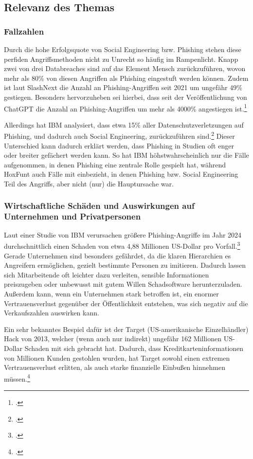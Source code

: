 \documentclass[12pt, a4paper, oneside]{scrartcl}
\begin{document}
\subsection{Relevanz des Themas}

\subsubsection{Fallzahlen}
Durch die hohe Erfolgsquote von Social Engineering bzw. Phishing stehen diese perfiden 
Angriffsmethoden nicht zu Unrecht so häufig im Rampenlicht. Knapp zwei von drei 
Databreaches sind auf das Element Mensch zurückzuführen, wovon mehr als 80\% von diesen Angriffen
als Phishing eingestuft werden können. Zudem ist laut SlashNext die Anzahl an Phishing-Angriffen
seit 2021 um ungefähr 49\% gestiegen. Besonders hervorzuheben sei hierbei, dass seit der Veröffentlichung
von ChatGPT die Anzahl an Phishing-Angriffen um mehr als 4000\% angestiegen ist.\footcite{HoxHunt_Report}
\par
Allerdings hat IBM analysiert, dass etwa 15\% aller Datenschutzverletzungen auf Phishing, und
dadurch auch Social Engineering, zurückzuführen sind.\footcite{IBM_Report}
Dieser Unterschied kann dadurch erklärt werden, dass Phishing in Studien oft enger oder breiter 
gefächert werden kann. So hat IBM höhstwahrscheinlich nur die Fälle aufgenommen, in denen 
Phishing eine zentrale Rolle gespielt hat, während HoxFunt auch Fälle mit einbezieht,
in denen Phishing bzw. Social Engineering Teil des Angriffs, aber nicht (nur) die Hauptursache war.

\subsubsection{Wirtschaftliche Schäden und Auswirkungen auf Unternehmen und Privatpersonen}
Laut einer Studie von IBM verursachen größere Phishing-Angriffe im Jahr 2024 durchschnittlich 
einen Schaden von etwa 4,88 Millionen US-Dollar pro Vorfall.\footcite{IBM_Phishing}
Gerade Unternehmen sind besonders gefährdet, da die klaren Hierarchien es Angreifern ermöglichen, 
gezielt bestimmte Personen zu imitieren. Dadurch lassen sich Mitarbeitende oft leichter dazu 
verleiten, sensible Informationen preiszugeben oder unbewusst mit gutem Willen Schadsoftware herunterzuladen.
Außerdem kann, wenn ein Unternehmen stark betroffen ist, ein enormer Vertrauensverlust gegenüber
der Öffentlichkeit entstehen, was sich negativ auf die Verkaufszahlen auswirken kann.
\par
Ein sehr bekanntes Bespiel dafür ist der Target (US-amerikanische Einzelhändler) Hack von 2013,
welcher (wenn auch nur indirekt) ungefähr 162 Millionen US-Dollar Schaden mit sich gebracht hat. Dadurch,
dass Kreditkarteninformationen von Millionen Kunden gestohlen wurden, hat Target sowohl einen extremen
Vertrauensverlust erlitten, als auch starke finanzielle Einbußen hinnehmen müssen.\footcite{Target_Breach}\\
\end{document}

